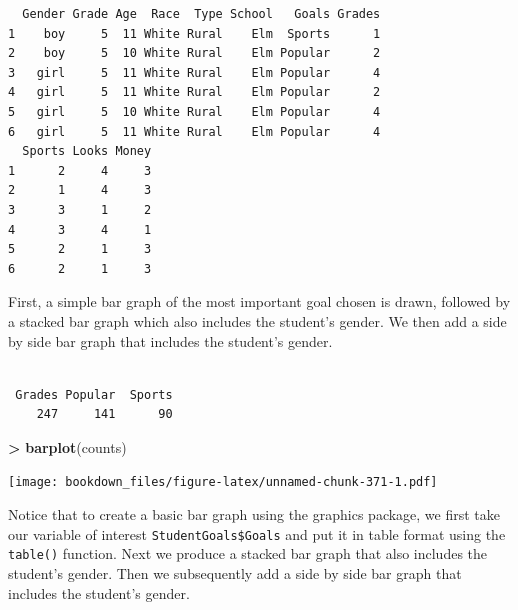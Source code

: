 \documentclass[]{krantz}
\makeatletter
\newenvironment{Shaded}{\begin{snugshade}}{\end{snugshade}}
\newcommand{\KeywordTok}[1]{\textcolor[rgb]{0.27,0.27,0.27}{\textbf{#1}}}
\newcommand{\StringTok}[1]{\textcolor[rgb]{0.5,0.5,0.5}{#1}}
\newcommand{\OperatorTok}[1]{\textcolor[rgb]{0.43,0.43,0.43}{\textbf{#1}}}
\newcommand{\NormalTok}[1]{#1}
\newenvironment{kframe}{%
\medskip{}
\setlength{\fboxsep}{.8em}
 \def\at@end@of@kframe{}%
 \ifinner\ifhmode%
  \def\at@end@of@kframe{\end{minipage}}%
  \begin{minipage}{\columnwidth}%
 \fi\fi%
 \def\FrameCommand##1{\hskip\@totalleftmargin \hskip-\fboxsep
 \colorbox{shadecolor}{##1}\hskip-\fboxsep
     \hskip-\linewidth \hskip-\@totalleftmargin \hskip\columnwidth}%
 \MakeFramed {\advance\hsize-\width
   \@totalleftmargin\z@ \linewidth\hsize
   \@setminipage}}%
 {\par\unskip\endMakeFramed%
 \at@end@of@kframe}
\renewenvironment{Shaded}{\begin{kframe}}{\end{kframe}}
\makeatother
\begin{document}
\begin{verbatim}
  Gender Grade Age  Race  Type School   Goals Grades
1    boy     5  11 White Rural    Elm  Sports      1
2    boy     5  10 White Rural    Elm Popular      2
3   girl     5  11 White Rural    Elm Popular      4
4   girl     5  11 White Rural    Elm Popular      2
5   girl     5  10 White Rural    Elm Popular      4
6   girl     5  11 White Rural    Elm Popular      4
  Sports Looks Money
1      2     4     3
2      1     4     3
3      3     1     2
4      3     4     1
5      2     1     3
6      2     1     3
\end{verbatim}

First, a simple bar graph of the most important goal chosen is drawn,
followed by a stacked bar graph which also includes the student's
gender. We then add a side by side bar graph that includes the student's
gender.

\begin{Shaded}
\end{Shaded}

\begin{verbatim}

 Grades Popular  Sports 
    247     141      90 
\end{verbatim}

\begin{Shaded}
\begin{Highlighting}[]
\OperatorTok{>}\StringTok{ }\KeywordTok{barplot}\NormalTok{(counts)}
\end{Highlighting}
\end{Shaded}

\texttt{[image: bookdown\_files/figure-latex/unnamed-chunk-371-1.pdf]}

Notice that to create a basic bar graph using the graphics package, we
first take our variable of interest \texttt{StudentGoals\$Goals} and put
it in table format using the \texttt{table()} function. Next we produce
a stacked bar graph that also includes the student's gender. Then we
subsequently add a side by side bar graph that includes the student's
gender.
\end{document}
